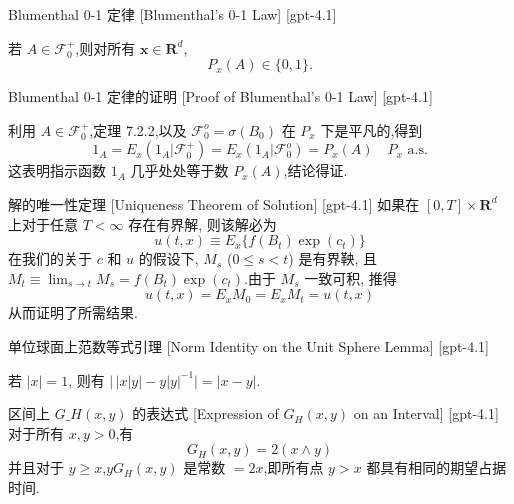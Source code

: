 \documentclass[UTF8]{ctexart}
\begin{document}
    \begin{thm}
        {Blumenthal 0-1 定律}
        [Blumenthal's 0-1 Law]
        [gpt-4.1]
        
若 $A \in \mathcal{F}_{0}^{+}$,则对所有 $\boldsymbol{x} \in \mathbf{R}^{d}$,
\[
P_{x}(A) \in \{ 0 , 1 \}.
\]

    \end{thm}
    
    
    
    \begin{prf}
        {Blumenthal 0-1 定律的证明}
        [Proof of Blumenthal's 0-1 Law]
        [gpt-4.1]
        
利用 $A \in \mathcal{F}_{0}^{+}$,定理 7.2.2,以及 $\mathcal{F}_{0}^{o} = \sigma(B_{0})$ 在 $P_{x}$ 下是平凡的,得到
\[
1_{A} = E_{x}(1_{A} | \mathcal{F}_{0}^{+}) = E_{x}(1_{A} | \mathcal{F}_{0}^{o}) = P_{x}(A) \quad P_{x}\text{ a.s.}
\]
这表明指示函数 $1_{A}$ 几乎处处等于数 $P_{x}(A)$,结论得证.

    \end{prf}
    
    
    
    \begin{thm}
        {解的唯一性定理}
        [Uniqueness Theorem of Solution]
        [gpt-4.1]
        如果在 $[0, T] \times \mathbf{R}^{d}$ 上对于任意 $T < \infty$ 存在有界解, 则该解必为
\[
u ( t , x ) \equiv E _ { x } \{ f ( B _ { t } ) \exp ( c _ { t } ) \}
\]
在我们的关于 $c$ 和 $u$ 的假设下, $M_s$ ($0 \leq s < t$) 是有界鞅, 且 $M_t \equiv \lim_{s \to t} M_s = f ( B_t ) \exp ( c_t )$.由于 $M_s$ 一致可积, 推得
\[
u ( t , x ) = E_x M_0 = E_x M_t = 
u ( t , x )
\]
从而证明了所需结果.

    \end{thm}
    
    
    
    \begin{lma}
        {单位球面上范数等式引理}
        [Norm Identity on the Unit Sphere Lemma]
        [gpt-4.1]
        
若 $|x| = 1$, 则有 $|\,|x|y| - y|y|^{-1}| = |x - y|$.

    \end{lma}
    
    
    
    \begin{thm}
        {区间上 $G\_H(x, y)$ 的表达式}
        [Expression of $G_H(x, y)$ on an Interval]
        [gpt-4.1]
        对于所有 $x, y > 0$,有
\[
G_H(x, y) = 2(x \wedge y)
\]
并且对于 $y \geq x$,$y G_H(x, y)$ 是常数 $= 2x$,即所有点 $y > x$ 都具有相同的期望占据时间.
    \end{thm}
    
\end{document}
